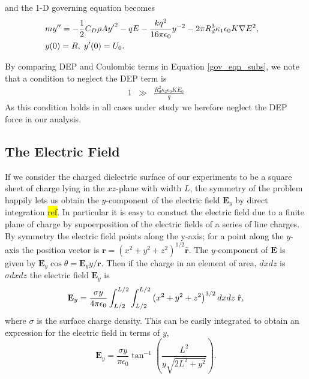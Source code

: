 \documentclass[a4paper, 12pt]{article}
\begin{document}
and the 1-D governing equation becomes
\begin{eqnarray} \label{gov_eqn_subs}
&m y'' = - \frac{1}{2} C_D \rho A {y'}^2 - q E - \frac{k q^2}{16 \pi \epsilon_0} y^{-2}- 2 \pi R_d^3 \kappa_1 \epsilon_0 K \nabla E^2,& \nonumber \\
&y(0) = R, \hspace{1 mm} y'(0) = U_0 .&
\end{eqnarray}

By comparing DEP and Coulombic terms in Equation \ref{gov_eqn_subs}, we note that a condition to neglect the DEP term is
\begin{eqnarray}
1 &\gg& \frac{R_d^2 \kappa_2 \epsilon_0 K E_0}{q} \nonumber
\end{eqnarray}
As this condition holds in all cases under study we herefore neglect the DEP force in our analysis.


\subsection{The Electric Field}
If we consider the charged dielectric surface of our experiments to be a square sheet of charge lying in the $xz$-plane with width $L$, the symmetry of the problem happily lets us obtain the $y$-component of the electric field $\mathbf{E}_y$ by direct integration \hl{ref}. In particular it is easy to constuct the electric field due to a finite plane of charge by supoerposition of the electric fields of a series of line charges. By symmetry the electric field points along the y-axis; for a point along the $y$-axis the position vector is $\mathbf{r} = \left( x^2 + y^2 + z^2 \right)^{1/2} \hat{\mathbf{r}}$. The $y$-component of $\mathbf{E}$ is given by $\mathbf{E}_y \cos \theta = \mathbf{E}_y y/ \mathbf{r}$. Then if the charge in an element of area, $dx dz$ is $\sigma dx dz$ the electric field $\mathbf{E}_y$ is
\[ \mathbf{E}_y = \frac{\sigma y}{4 \pi \epsilon_0} \int^{L/2}_{L/2} \int^{L/2}_{L/2} \left( x^2 + y^2 + z^2 \right)^{3/2} dx dz \hspace{1mm}\hat{\mathbf{r}} 
,\]
where $\sigma$ is the surface charge density. This can be easily integrated to obtain an expression for the electric field in terms of $y$, 
\begin{equation}
\mathbf{E}_y = \frac{\sigma y}{ \pi \epsilon_0} \tan^{-1} \left( \frac{L^2}{y \sqrt{2L^2 + y^2}}\right)
.\end{equation}
\end{document}
